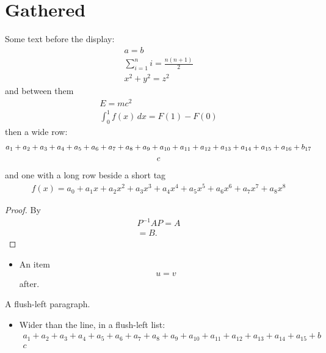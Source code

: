 \documentclass{article}
\begin{document}
\section{Gathered}
Some text before the display:
\begin{gather}
a = b \\
\sum_{i=1}^n i = \frac{n(n+1)}{2} \nonumber \\
x^2 + y^2 = z^2
\end{gather}
and between them
\begin{gather*}
E = mc^2 \\
\int_0^1 f(x)\,dx = F(1) - F(0)
\end{gather*}
then a wide row:
\begin{gather}
a_1 + a_2 + a_3 + a_4 + a_5 + a_6 + a_7 + a_8 + a_9 + a_{10} + a_{11} + a_{12} + a_{13} + a_{14} + a_{15} + a_{16} + b_{17} \\
c \notag
\end{gather}
and one with a long row beside a short tag
\begin{gather}
f(x) = a_0 + a_1 x + a_2 x^2 + a_3 x^3 + a_4 x^4 + a_5 x^5 + a_6 x^6 + a_7 x^7 + a_8 x^8
\end{gather}
\begin{proof}
By \begin{gather}
  P^{-1}AP = A \\
  = B.
\end{gather}
\end{proof}
\begin{itemize}
\item An item \begin{gather} u = v \end{gather} after.
\end{itemize}
\begin{flushleft}
A flush-left paragraph.

\begin{itemize}
\item Wider than the line, in a flush-left list:
\begin{gather*}
a_1 + a_2 + a_3 + a_4 + a_5 + a_6 + a_7 + a_8 + a_9 + a_{10} + a_{11} + a_{12} + a_{13} + a_{14} + a_{15} + b \\
c
\end{gather*}
\end{itemize}
\end{flushleft}
\end{document}
